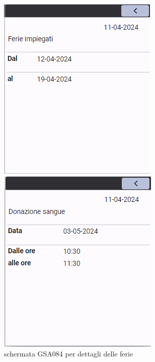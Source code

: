 \documentclass[target=bach,aauheader=,style=]{thud}
\begin{document}
\begin{figure}[h]
    \centering
    \begin{minipage}{0.3\textwidth}
        \centering
        \includegraphics[width=\linewidth]{screenshot/Interfaccia_gsa084_ferie.png}
        \caption{schermata GSA084 per dettagli delle ferie}
    \end{minipage}
    \hfill
    \begin{minipage}{0.3\textwidth}
        \centering
        \includegraphics[width=\linewidth]{screenshot/Interfaccia_gsa084_AUT.png}

\end{minipage}
\end{figure}
\end{document}

